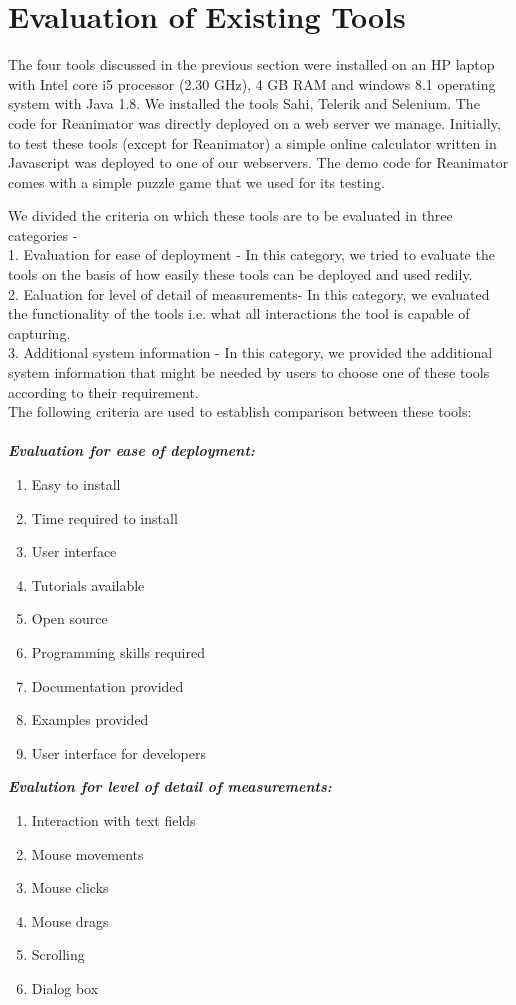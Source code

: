 \documentclass[12pt,journal]{IEEEtran}
\begin{document}
\section{Evaluation of Existing Tools}
The four tools discussed in the previous section were installed on an HP laptop with Intel core i5 processor (2.30 GHz), 4 GB RAM and windows 8.1 operating system with Java 1.8. We installed the tools Sahi, Telerik and Selenium. The code for Reanimator was directly deployed on a web server we manage. Initially, to test these tools (except for Reanimator) a simple online calculator written in Javascript was deployed to one of our webservers. The demo code for Reanimator comes with a simple puzzle game that we used for its testing.
\par
We divided the criteria on which these tools are to be evaluated in three categories - \\
1. Evaluation for ease of deployment - In this category, we tried to evaluate the tools on the basis of how easily these tools can be deployed and used redily.\\
2. Ealuation for level of detail of measurements- In this category, we evaluated the functionality of the tools i.e. what all interactions the tool is capable of capturing.\\
3. Additional system information - In this category, we provided the additional system information that might be needed by users to choose one of these tools according to their requirement.\\ 
The following criteria are used to establish comparison between these tools:\\ \\
\textbf{ \textit{Evaluation for ease of deployment:}}
\begin{enumerate}
\item Easy to install
\item Time required to install
\item User interface
\item Tutorials available
\item Open source
\item Programming skills required
\item Documentation provided
\item Examples provided
\item User interface for developers\\
\end{enumerate}
\textbf{\textit{Evalution for level of detail of measurements:}}
\begin{enumerate}
\item Interaction with text fields
\item Mouse movements
\item Mouse clicks
\item Mouse drags
\item Scrolling
\item Dialog box\\
\end{enumerate}
\end{document}

